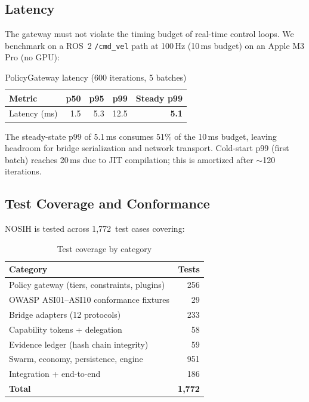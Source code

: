 \documentclass[conference]{IEEEtran}
\begin{document}
\subsection{Latency}

The gateway must not violate the timing budget of real-time control loops.
We benchmark on a ROS~2 \texttt{/cmd\_vel} path at 100\,Hz (10\,ms budget)
on an Apple M3 Pro (no GPU):

\begin{table}[h]
\centering
\caption{PolicyGateway latency (600 iterations, 5 batches)}
\label{tab:latency}
\begin{tabular}{@{}lrrrr@{}}
\toprule
Metric & p50 & p95 & p99 & Steady p99 \\
\midrule
Latency (ms) & 1.5 & 5.3 & 12.5 & \textbf{5.1} \\
\bottomrule
\end{tabular}
\end{table}

The steady-state p99 of 5.1\,ms consumes 51\% of the 10\,ms budget, leaving
headroom for bridge serialization and network transport.
Cold-start p99 (first batch) reaches 20\,ms due to JIT compilation; this is
amortized after $\sim$120 iterations.

\subsection{Test Coverage and Conformance}

NOSIH is tested across 1,772~test cases covering:

\begin{table}[h]
\centering
\caption{Test coverage by category}
\label{tab:tests}
\begin{tabular}{@{}lr@{}}
\toprule
Category & Tests \\
\midrule
Policy gateway (tiers, constraints, plugins) & 256 \\
OWASP ASI01--ASI10 conformance fixtures & 29 \\
Bridge adapters (12 protocols) & 233 \\
Capability tokens + delegation & 58 \\
Evidence ledger (hash chain integrity) & 59 \\
Swarm, economy, persistence, engine & 951 \\
Integration + end-to-end & 186 \\
\midrule
\textbf{Total} & \textbf{1,772} \\
\bottomrule
\end{tabular}
\end{table}
\end{document}
